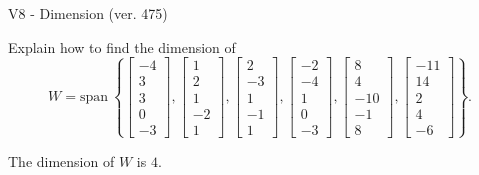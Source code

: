 \begin{exercise}
  \begin{exerciseTitle}V8 - Dimension (ver. 475)\end{exerciseTitle}
  \begin{exerciseStatement}
    Explain how to find the dimension of 
\[W=\mathrm{span}\ \left\{\left[\begin{array}{r}
-4 \\
3 \\
3 \\
0 \\
-3
\end{array}\right] , \left[\begin{array}{r}
1 \\
2 \\
1 \\
-2 \\
1
\end{array}\right] , \left[\begin{array}{r}
2 \\
-3 \\
1 \\
-1 \\
1
\end{array}\right] , \left[\begin{array}{r}
-2 \\
-4 \\
1 \\
0 \\
-3
\end{array}\right] , \left[\begin{array}{r}
8 \\
4 \\
-10 \\
-1 \\
8
\end{array}\right] , \left[\begin{array}{r}
-11 \\
14 \\
2 \\
4 \\
-6
\end{array}\right]\right\}.\]



  \end{exerciseStatement}
  \begin{exerciseAnswer}
   The dimension of \(W\) is  \(4\).
  


  \end{exerciseAnswer}
\end{exercise}